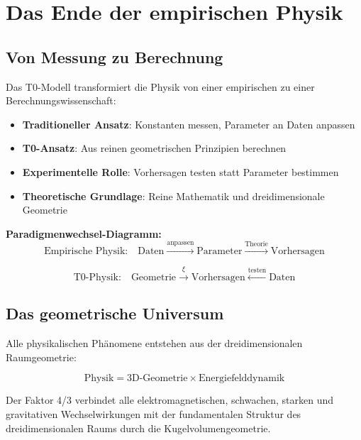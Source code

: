\documentclass[12pt,a4paper]{report}
\begin{document}
	\section{Das Ende der empirischen Physik}
	\label{sec:end_empirical_physics}
	
	\subsection{Von Messung zu Berechnung}
	\label{subsec:measurement_to_calculation}
	
	Das T0-Modell transformiert die Physik von einer empirischen zu einer Berechnungswissenschaft:
	
	\begin{itemize}
		\item \textbf{Traditioneller Ansatz}: Konstanten messen, Parameter an Daten anpassen
		\item \textbf{T0-Ansatz}: Aus reinen geometrischen Prinzipien berechnen
		\item \textbf{Experimentelle Rolle}: Vorhersagen testen statt Parameter bestimmen
		\item \textbf{Theoretische Grundlage}: Reine Mathematik und dreidimensionale Geometrie
	\end{itemize}
	
	\textbf{Paradigmenwechsel-Diagramm:}
	\begin{equation}
		\text{Empirische Physik:} \quad \text{Daten} \xrightarrow{\text{anpassen}} \text{Parameter} \xrightarrow{\text{Theorie}} \text{Vorhersagen}
	\end{equation}
	
	\begin{equation}
		\text{T0-Physik:} \quad \text{Geometrie} \xrightarrow{\xi} \text{Vorhersagen} \xleftarrow{\text{testen}} \text{Daten}
	\end{equation}
	
	\subsection{Das geometrische Universum}
	\label{subsec:geometric_universe}
	
	Alle physikalischen Phänomene entstehen aus der dreidimensionalen Raumgeometrie:
	
	\begin{equation}
		\text{Physik} = \text{3D-Geometrie} \times \text{Energiefelddynamik}
	\end{equation}
	
	Der Faktor 4/3 verbindet alle elektromagnetischen, schwachen, starken und gravitativen Wechselwirkungen mit der fundamentalen Struktur des dreidimensionalen Raums durch die Kugelvolumengeometrie.
	
\end{document}
